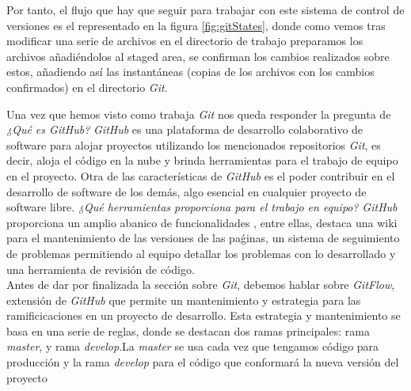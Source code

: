 \documentclass[a4paper, 12pt]{book}
\begin{document}
Por tanto, el flujo que hay que seguir para trabajar con este sistema de control de versiones es el representado en la figura \ref{fig:gitStates}, donde como vemos tras modificar una serie de archivos en el directorio de trabajo preparamos los archivos añadiéndolos al staged area, se confirman los cambios realizados sobre estos, añadiendo así las instantáneas (copias de los archivos con los cambios confirmados) en el directorio \emph{Git}. 

Una vez que hemos visto como trabaja \emph{Git} nos queda responder la pregunta de \textit{¿Qué es GitHub?} \emph{GitHub} es una plataforma de desarrollo colaborativo de software para alojar proyectos utilizando los mencionados repositorios \emph{Git}, es decir, aloja el código en la nube y brinda herramientas para el trabajo de equipo en el proyecto. Otra de las características de \emph{GitHub} es el poder contribuir en el desarrollo de software de los demás, algo esencial en cualquier proyecto de software libre. \textit{¿Qué herramientas proporciona para el trabajo en equipo?} \emph{GitHub} proporciona un amplio abanico de funcionalidades , entre ellas, destaca una wiki para el mantenimiento de las versiones de las paǵinas, un sistema de seguimiento de problemas permitiendo al equipo detallar los problemas con lo desarrollado y una herramienta de revisión de código. \\ 
Antes de dar por finalizada la sección sobre \emph{Git}, debemos hablar sobre \emph{GitFlow}, extensión de \emph{GitHub} que permite un mantenimiento y estrategia para las ramificicaciones en un proyecto de desarrollo. Esta estrategia y mantenimiento se basa en una serie de reglas, donde se destacan dos ramas principales: rama \textit{master}, y rama \textit{develop}.La \textit{master} se usa cada vez que tengamos código para producción y la rama \textit{develop} para el código que conformará la nueva versión del proyecto \\
\end{document}
